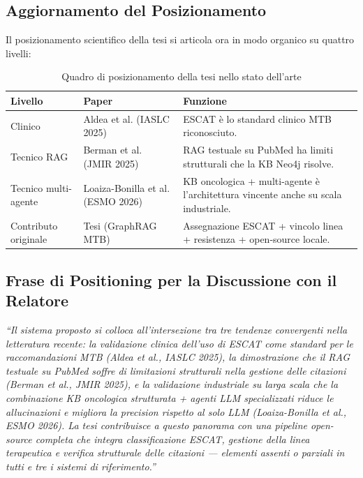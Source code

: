 \documentclass[12pt, a4paper]{article}
\begin{document}
\subsection{Aggiornamento del Posizionamento}
Il posizionamento scientifico della tesi si articola ora in modo organico su quattro livelli:

\begin{table}[htbp]
\centering
\small
\renewcommand{\arraystretch}{1.3}
\caption{Quadro di posizionamento della tesi nello stato dell'arte}
\begin{tabularx}{\textwidth}{l l X}
\toprule
\rowcolor{primaryblue}
\color{white}\textbf{Livello} & \color{white}\textbf{Paper} & \color{white}\textbf{Funzione} \\
\midrule
Clinico & Aldea et al. (IASLC 2025) & ESCAT è lo standard clinico MTB riconosciuto. \\
\rowcolor{roweven}
Tecnico RAG & Berman et al. (JMIR 2025) & RAG testuale su PubMed ha limiti strutturali che la KB Neo4j risolve. \\
Tecnico multi-agente & Loaiza-Bonilla et al. (ESMO 2026) & KB oncologica + multi-agente è l'architettura vincente anche su scala industriale. \\
\rowcolor{roweven}
Contributo originale & Tesi (GraphRAG MTB) & Assegnazione ESCAT + vincolo linea + resistenza + open-source locale. \\
\bottomrule
\end{tabularx}
\end{table}

\subsection{Frase di Positioning per la Discussione con il Relatore}
\textit{``Il sistema proposto si colloca all'intersezione tra tre tendenze convergenti nella letteratura recente: la validazione clinica dell'uso di ESCAT come standard per le raccomandazioni MTB (Aldea et al., IASLC 2025), la dimostrazione che il RAG testuale su PubMed soffre di limitazioni strutturali nella gestione delle citazioni (Berman et al., JMIR 2025), e la validazione industriale su larga scala che la combinazione KB oncologica strutturata + agenti LLM specializzati riduce le allucinazioni e migliora la precision rispetto al solo LLM (Loaiza-Bonilla et al., ESMO 2026). La tesi contribuisce a questo panorama con una pipeline open-source completa che integra classificazione ESCAT, gestione della linea terapeutica e verifica strutturale delle citazioni --- elementi assenti o parziali in tutti e tre i sistemi di riferimento.''}
\end{document}
